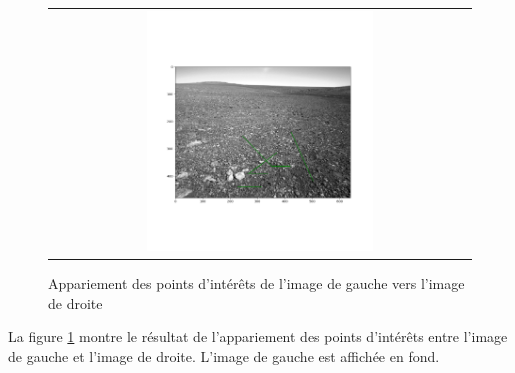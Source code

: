 \documentclass[12pt]{article}
\begin{document}
\begin{figure}[ht]
 \begin{center}
  \begin{tabular}{c}
    \includegraphics[width=0.55\textwidth]{q5-appariement.png}
  \end{tabular}
 \end{center}
\vspace{-0.25in}
 \caption{Appariement des points d'intérêts de l'image de gauche vers l'image de droite}
    \label{appariement}
\end{figure}

La figure \ref{appariement} montre le résultat de l'appariement des points d'intérêts entre l'image de gauche et l'image de droite.
L'image de gauche est affichée en fond.
\end{document}

